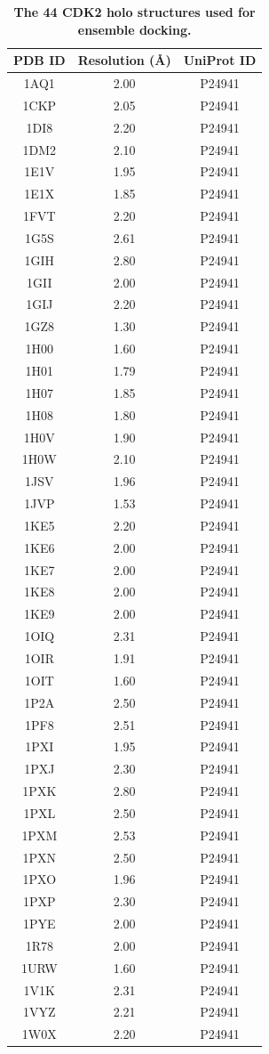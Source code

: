 \documentclass[10pt]{article}
\begin{document}
\begin{table}[!ht]
\caption{
\bf{The 44 CDK2 holo structures used for ensemble docking.}}
\begin{tabular}{ccc}
\hline
PDB ID & Resolution (\AA) & UniProt ID\\
\hline
1AQ1 & 2.00 & P24941\\
1CKP & 2.05 & P24941\\
1DI8 & 2.20 & P24941\\
1DM2 & 2.10 & P24941\\
1E1V & 1.95 & P24941\\
1E1X & 1.85 & P24941\\
1FVT & 2.20 & P24941\\
1G5S & 2.61 & P24941\\
1GIH & 2.80 & P24941\\
1GII & 2.00 & P24941\\
1GIJ & 2.20 & P24941\\
1GZ8 & 1.30 & P24941\\
1H00 & 1.60 & P24941\\
1H01 & 1.79 & P24941\\
1H07 & 1.85 & P24941\\
1H08 & 1.80 & P24941\\
1H0V & 1.90 & P24941\\
1H0W & 2.10 & P24941\\
1JSV & 1.96 & P24941\\
1JVP & 1.53 & P24941\\
1KE5 & 2.20 & P24941\\
1KE6 & 2.00 & P24941\\
1KE7 & 2.00 & P24941\\
1KE8 & 2.00 & P24941\\
1KE9 & 2.00 & P24941\\
1OIQ & 2.31 & P24941\\
1OIR & 1.91 & P24941\\
1OIT & 1.60 & P24941\\
1P2A & 2.50 & P24941\\
1PF8 & 2.51 & P24941\\
1PXI & 1.95 & P24941\\
1PXJ & 2.30 & P24941\\
1PXK & 2.80 & P24941\\
1PXL & 2.50 & P24941\\
1PXM & 2.53 & P24941\\
1PXN & 2.50 & P24941\\
1PXO & 1.96 & P24941\\
1PXP & 2.30 & P24941\\
1PYE & 2.00 & P24941\\
1R78 & 2.00 & P24941\\
1URW & 1.60 & P24941\\
1V1K & 2.31 & P24941\\
1VYZ & 2.21 & P24941\\
1W0X & 2.20 & P24941\\
\end{tabular}
\begin{flushleft}\label{PDBs}
\end{flushleft}
\end{table}

\end{document}

